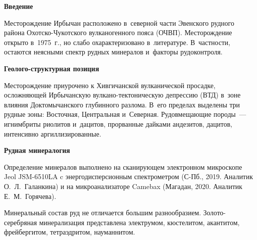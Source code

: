  



\makeProcTitleNewLine

\textbf{Введение}

Месторождение Ирбычан расположено в~северной части Эвенского рудного района Охотско-Чукотского вулканогенного пояса (ОЧВП). Месторождение открыто в~1975~г., но слабо охарактеризовано в~литературе. В~частности, остаются неясными спектр рудных минералов и~факторы рудоконтроля.

\textbf{Геолого-структурная позиция}

Месторождение приурочено к Хивгичанской вулканической просадке, осложняющей Ирбычанскую вулкано-тектоническую депрессию (ВТД) в~зо\-не влияния Доктомычанского глубинного разлома. В~его пределах выделены три рудные зоны: Восточная, Центральная и~Северная. Рудовмещающие породы~--- игнимбриты риолитов и~дацитов, прорванные дайками андезитов, дацитов, интенсивно аргиллизированные.

\textbf{Рудная минералогия}

Определение минералов выполнено на сканирующем электронном микроскопе Jeol JSM-6510LA c энергодисперсионным спектрометром (С-Пб., 2019. Аналитик О.~Л.~Галанкина) и на микроанализаторе Camebax (Магадан, 2020. Аналитик Е.~М.~Горячева).

Минеральный состав руд не отличается большим разнообразием. Золото-серебряная минерализация представлена электрумом, кюстелитом, акантитом, фрейбергитом, тетраэдритом, науманнитом.

